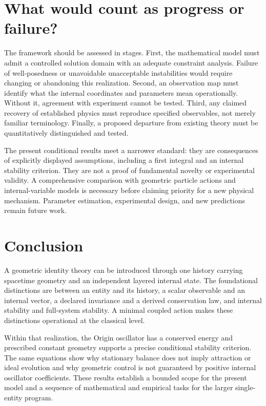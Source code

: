\documentclass[11pt]{article}
\begin{document}
\section{What would count as progress or failure?}
The framework should be assessed in stages. First, the mathematical model must admit a controlled solution domain with an adequate constraint analysis. Failure of well-posedness or unavoidable unacceptable instabilities would require changing or abandoning this realization. Second, an observation map must identify what the internal coordinates and parameters mean operationally. Without it, agreement with experiment cannot be tested. Third, any claimed recovery of established physics must reproduce specified observables, not merely familiar terminology. Finally, a proposed departure from existing theory must be quantitatively distinguished and tested.

The present conditional results meet a narrower standard: they are consequences of explicitly displayed assumptions, including a first integral and an internal stability criterion. They are not a proof of fundamental novelty or experimental validity. A comprehensive comparison with geometric particle actions and internal-variable models is necessary before claiming priority for a new physical mechanism. Parameter estimation, experimental design, and new predictions remain future work.

\section{Conclusion}
A geometric identity theory can be introduced through one history carrying spacetime geometry and an independent layered internal state. The foundational distinctions are between an entity and its history, a scalar observable and an internal vector, a declared invariance and a derived conservation law, and internal stability and full-system stability. A minimal coupled action makes these distinctions operational at the classical level.

Within that realization, the Origin oscillator has a conserved energy and prescribed constant geometry supports a precise conditional stability criterion. The same equations show why stationary balance does not imply attraction or ideal evolution and why geometric control is not guaranteed by positive internal oscillator coefficients. These results establish a bounded scope for the present model and a sequence of mathematical and empirical tasks for the larger single-entity program.
\end{document}
